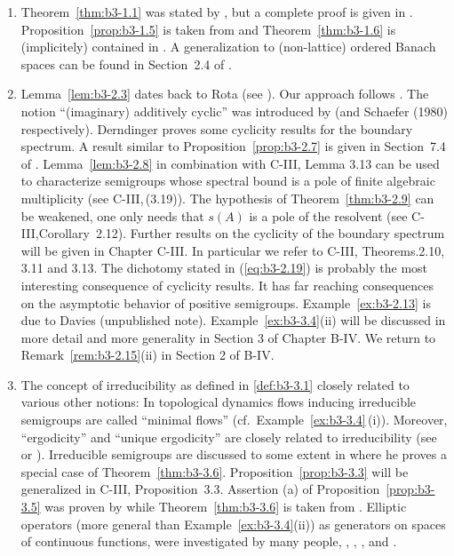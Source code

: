 \begin{enumerate}[label=\emph{Section \arabic*:}, wide]

\item
Theorem~\ref{thm:b3-1.1} was stated by \citet{karlin:1959}, but a complete proof is given in \citet{derndinger:1980}.
Proposition~\ref{prop:b3-1.5}  is taken from \citet{greiner:1982} and Theorem~\ref{thm:b3-1.6} is (implicitely) contained in \citet{derndingernagel:1979}.
A generalization to (non-lattice) ordered Banach spaces can be found in Section~2.4 of \citet{battyrobinson:1984}.

\item
Lemma~\ref{lem:b3-2.3} dates back to Rota (see \citet{schaefer:1974}).
Our approach follows \citet{greiner:1981}.
The notion \enquote{(imaginary) additively cyclic} was introduced by \citet{derndinger:1980} (and {Schaefer (1980)} respectively).
Derndinger proves some cyclicity results for the boundary spectrum.
A result similar to Proposition~\ref{prop:b3-2.7} is given in Section~7.4 of \citet{davies:1980}.
Lemma~\ref{lem:b3-2.8} in combination with C-III, Lemma 3.13 can be used to characterize semigroups whose spectral bound is a pole of finite algebraic multiplicity (see C-III,\,(3.19)).
The hypothesis of Theorem~\ref{thm:b3-2.9} can be weakened, one only needs that $s(A)$ is a pole of the resolvent (see C-III,Corollary~2.12).
Further results on the cyclicity of the boundary spectrum will be given in Chapter C-III.
In particular we refer to C-III, Theorems.2.10, 3.11 and 3.13.
The dichotomy stated in (\ref{eq:b3-2.19})  is probably the most interesting consequence of cyclicity results.
It has far reaching consequences on the asymptotic behavior of positive semigroups.
Example~\ref{ex:b3-2.13} is due to Davies (unpublished note).
Example~\ref{ex:b3-3.4}(ii) will be discussed in more detail and more generality in Section 3 of Chapter B-IV.
We return to Remark~\ref{rem:b3-2.15}(ii) in Section 2 of B-IV.

\item
The concept of irreducibility as defined in \ref{def:b3-3.1} closely related to various other notions:
In topological dynamics flows inducing irreducible semigroups are called \enquote{minimal flows} (cf.\ Example~\ref{ex:b3-3.4}\,(i)).
Moreover, \enquote{ergodicity} and \enquote{unique ergodicity} are closely related to irreducibility (see \citet{cornfeldetal:1982} or \citet{krengel:1985}).
Irreducible semigroups are discussed to some extent in \citet{davies:1980} where he proves a special case of Theorem~\ref{thm:b3-3.6}.
Proposition~\ref{prop:b3-3.3} will be generalized in C-III, Proposition~3.3.
Assertion (a) of Proposition~\ref{prop:b3-3.5} was proven by \citet{schaefer:1982} while Theorem~\ref{thm:b3-3.6} is taken from \citet{greiner:1982}.
Elliptic operators (more general than Example~\ref{ex:b3-3.4}(ii)) as generators on spaces of continuous functions, were investigated by many people, \eg \citet{bonyetal:1968}, \citet{kuhn:1984}, \citet{roth:1976}, \citet{roth:1978} and \citet{stewart:1974}.


\end{enumerate}
